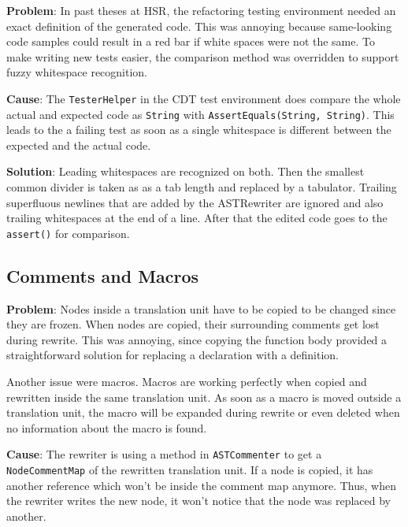 \textbf{Problem}: 
In past theses at HSR, the refactoring testing environment needed an exact
definition of the generated code. This was annoying because same-looking code
samples could result in a red bar if white spaces were not the same. To make
writing new tests easier, the comparison method was overridden to support fuzzy
whitespace recognition.

\textbf{Cause}: The \texttt{TesterHelper} in the CDT test environment does
compare the whole actual and expected code as \texttt{String} with \cite{JUnit}
\texttt{AssertEquals(String, String)}. This leads to the a failing test as
soon as a single whitespace is different between the expected and the actual
code.

\textbf{Solution}: Leading whitespaces are recognized on both. Then the smallest
common divider is taken as as a tab length and replaced by a tabulator. Trailing
superfluous newlines that are added by the ASTRewriter are ignored and also
trailing whitespaces at the end of a line. After that the edited code goes to
the \texttt{assert()} for comparison.

\subsection{Comments and Macros}
\textbf{Problem}: Nodes inside a translation unit have to be copied to be 
changed since they are frozen. When nodes are copied, their surrounding comments 
get lost during rewrite\cite{Sommerlad:2008:RCR:1449814.1449817}. This was
annoying, since copying the function body provided a straightforward solution
for replacing a declaration with a definition.

Another issue were macros. Macros are working perfectly when copied and 
rewritten inside the same translation unit. As soon as a macro is moved outside 
a translation unit, the macro will be expanded during rewrite or even
deleted when no information about the macro is found.

\textbf{Cause}: The rewriter is using a method in \texttt{ASTCommenter} to get a 
\texttt{NodeCommentMap} of the rewritten translation unit. If a node is copied, 
it has another reference which won't be inside the comment map anymore. Thus, 
when the rewriter writes the new node, it won't notice that the node was 
replaced by another.

